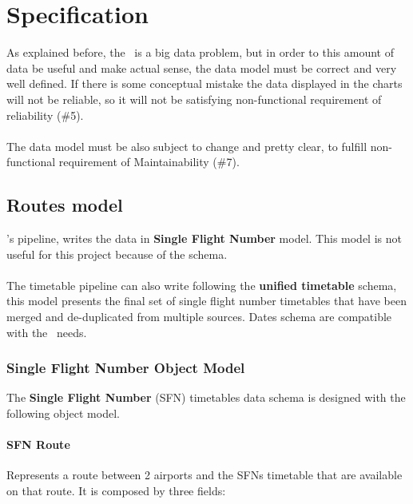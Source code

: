 
\chapter{Specification}

\label{chapter05}

As explained before, the \thesis\ is a big data problem, but in order to this amount of data be useful and make actual sense, the data model must be correct and very well defined. If there is some conceptual mistake the data displayed in the charts will not be reliable, so it will not be satisfying non-functional requirement of reliability (\#5).
\\\\
The data model must be also subject to change and pretty clear, to fulfill non-functional requirement of Maintainability (\#7).


\section{Routes model} \label{routes_model}

\squad's pipeline, writes the data in \textbf{Single Flight Number} model. This model is not useful for this project because of the  schema.
\\\\
The timetable pipeline can also write following the \textbf{unified timetable} schema, this model presents the final set of single flight number timetables that have been merged and de-duplicated from multiple sources. Dates schema are compatible with the \thesis\ needs.

\subsection{Single Flight Number Object Model} \label{sfn-model}

The \textbf{Single Flight Number} (SFN) timetables data schema is designed with the following object model.

\subsubsection*{SFN Route}

Represents a route between 2 airports and the SFNs timetable that are available on that route. It is composed by three fields:

